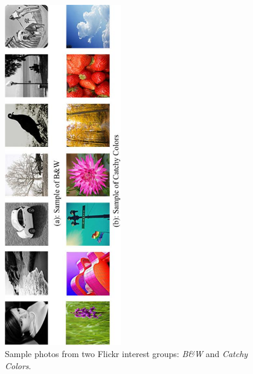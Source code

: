\begin{figure}[h]
\begin{center}
\includegraphics[width=2.0in,angle=270]{figures/sample.eps}%
\caption{Sample photos from two Flickr interest groups: {\em B\&W} and {\em Catchy Colors}.}
\end{center}
\end{figure}

